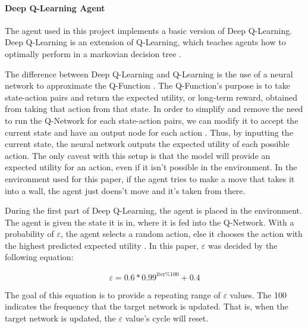 \documentclass[12pt,letterpaper]{article}
\begin{document}
\paragraph{Deep Q-Learning Agent}

The agent used in this project implements a basic version of Deep Q-Learning.
Deep Q-Learning is an extension of Q-Learning, which teaches agents how to optimally perform in a markovian decision tree \cite{article_q_learning}.

The difference between Deep Q-Learning and Q-Learning is the use of a neural network to approximate the Q-Function \cite{article_human_level_control_deep_reinforcement_learning}.
The Q-Function's purpose is to take state-action pairs and return the expected utility, or long-term reward, obtained from taking that action from that state.
In order to simplify and remove the need to run the Q-Network for each state-action pairs, we can modify it to accept the current state and have an output node for each action \cite{article_reinforcement_learning_survey}.
Thus, by inputting the current state, the neural network outputs the expected utility of each possible action.
The only caveat with this setup is that the model will provide an expected utility for an action, even if it isn't possible in the environment.
In the environment used for this paper, if the agent tries to make a move that takes it into a wall, the agent just doens't move and it's taken from there.

During the first part of Deep Q-Learning, the agent is placed in the environment.
The agent is given the state it is in, where it is fed into the Q-Network.
With a probability of $\varepsilon$, the agent selects a random action, else it chooses the action with the highest predicted expected utility \cite{article_reinforcement_learning_survey}.
In this paper, $\varepsilon$ was decided by the following equation:

$$\varepsilon = 0.6 * 0.99^{\text{iter} \% 100} + 0.4$$

The goal of this equation is to provide a repeating range of $\varepsilon$ values.
The 100 indicates the frequency that the target network is updated.
That is, when the target network is updated, the $\varepsilon$ value's cycle will reset.
\end{document}
